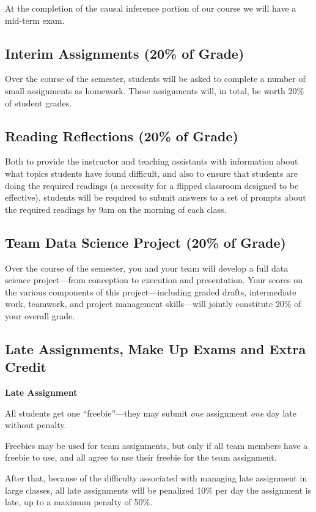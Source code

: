 \documentclass[12pt]{article}
\begin{document}
At the completion of the causal inference portion of our course we will have a mid-term exam. 

\subsection{Interim Assignments (20\% of Grade)}

Over the course of the semester, students will be asked to complete a number of small assignments as homework. These assignments will, in total, be worth 20\% of student grades.

\subsection{Reading Reflections (20\% of Grade)}

Both to provide the instructor and teaching assistants with information about what topics students have found difficult, and also to ensure that students are doing the required readings (a necessity for a flipped classroom designed to be effective), students will be required to submit answers to a set of prompts about the required readings by 9am on the morning of each class.

\subsection{Team Data Science Project (20\% of Grade)}

Over the course of the semester, you and your team will develop a full data science project—from conception to execution and presentation. Your scores on the various components of this project—including graded drafts, intermediate work, teamwork, and project management skills—will jointly constitute 20\% of your overall grade.

\subsection{Late Assignments, Make Up Exams and Extra Credit}

\textbf{Late Assignment}

All students get one ``freebie''—they may submit \emph{one} assignment \emph{one} day late without penalty.

Freebies may be used for team assignments, but only if all team members have a freebie to use, and all agree to use their freebie for the team assignment.

After that, because of the difficulty associated with managing late assignment in large classes, all late assignments will be penalized 10\% per day the assignment is late, up to a maximum penalty of 50\%. 
\end{document}
